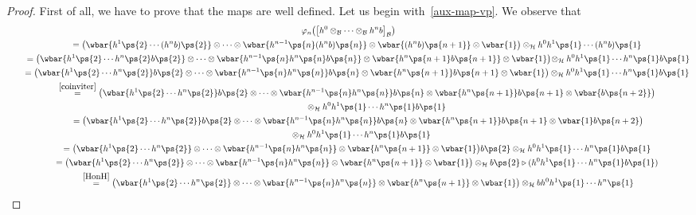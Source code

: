 \begin{proof}
First of all, we have to prove that the maps are well def\/ined.
Let us begin with~\eqref{aux-map-vp}.
We observe that
\begin{gather*}
\varphi_n\big(\big[h^0\otimes_{\cal B}\cdots\otimes_{\cal B} h^nb\big]_{\cal B}\big)
\\
\qquad
=\big(\wbar{h^1\ps{2}\cdots (h^nb)\ps{2}}
\otimes\dots\otimes \wbar{h^{n-1}\ps{n}(h^nb)\ps{n}} \otimes
\wbar{(h^nb)\ps{n+1}} \otimes \wbar{1} \big)
\otimes_{\cal H} h^0h^1\ps{1}\cdots (h^nb)\ps{1}
\\
\qquad{}
=\big(\wbar{h^1\ps{2}\cdots h^n\ps{2}b\ps{2}}
\otimes\dots\otimes \wbar{h^{n-1}\ps{n}h^n\ps{n}b\ps{n}} \otimes
\wbar{h^n\ps{n+1}b\ps{n+1}} \otimes \wbar{1} \big)\!
\otimes_{\cal H} h^0h^1\ps{1}\cdots h^n\ps{1}b\ps{1}
\\
\qquad
=\big(\wbar{h^1\ps{2}\cdots h^n\ps{2}}b\ps{2}
\otimes\dots\otimes \wbar{h^{n-1}\ps{n}h^n\ps{n}}b\ps{n} \otimes
\wbar{h^n\ps{n+1}}b\ps{n+1} \otimes \wbar{1}\big) \otimes_{\cal H} h^0h^1\ps{1}\cdots h^n\ps{1}b\ps{1}
\\
\qquad
\stackrel{\eqref{coinviter}}{=}
\big(\wbar{h^1\ps{2}\cdots h^n\ps{2}}b\ps{2}
\otimes\dots\otimes \wbar{h^{n-1}\ps{n}h^n\ps{n}}b\ps{n} \otimes
\wbar{h^n\ps{n+1}}b\ps{n+1} \otimes \wbar{b\ps{n+2}}\big)\\
\qquad\hphantom{\stackrel{\eqref{coinviter}}{=}}{}
\otimes_{\cal H} h^0h^1\ps{1}\cdots h^n\ps{1}b\ps{1}
\\
\qquad{}
=\big(\wbar{h^1\ps{2}\cdots h^n\ps{2}}b\ps{2}
\otimes\dots\otimes \wbar{h^{n-1}\ps{n}h^n\ps{n}}b\ps{n} \otimes
\wbar{h^n\ps{n+1}}b\ps{n+1} \otimes \wbar{1}b\ps{n+2}\big)\\
\qquad{}
\hphantom{=}{}
 \otimes_{\cal H} h^0h^1\ps{1}\cdots h^n\ps{1}b\ps{1}
\\
\qquad
=\big(\wbar{h^1\ps{2}\cdots h^n\ps{2}}
\otimes\dots\otimes \wbar{h^{n-1}\ps{n}h^n\ps{n}} \otimes \wbar{h^n\ps{n+1}}
\otimes \wbar{1}\big)b\ps{2} \otimes_{\cal H} h^0h^1\ps{1}\cdots h^n\ps{1}b\ps{1}
\\
\qquad
=\big(\wbar{h^1\ps{2}\cdots h^n\ps{2}}
\otimes\dots\otimes \wbar{h^{n-1}\ps{n}h^n\ps{n}} \otimes \wbar{h^n\ps{n+1}}
\otimes \wbar{1}\big) \otimes_{\cal H} b\ps{2}\triangleright (h^0h^1\ps{1}\cdots h^n\ps{1}b\ps{1})
\\
\qquad{}
\stackrel{\eqref{HonH}}{=}
\big(\wbar{h^1\ps{2}\cdots h^n\ps{2}}
\otimes\dots\otimes \wbar{h^{n-1}\ps{n}h^n\ps{n}} \otimes \wbar{h^n\ps{n+1}}
\otimes \wbar{1}\big) \otimes_{\cal H} bh^0h^1\ps{1}\cdots h^n\ps{1}

\end{gather*}
\end{proof}
